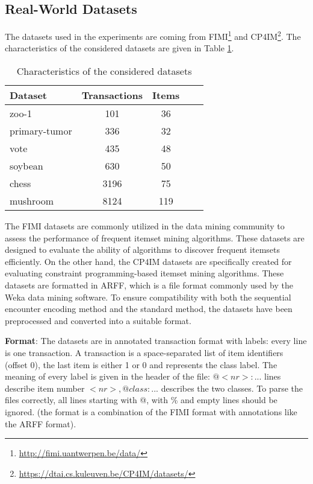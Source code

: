 \subsection{Real-World Datasets}
The datasets used in the experiments are coming from FIMI\footnote{\url{http://fimi.uantwerpen.be/data/}} and CP4IM\footnote{\url{https://dtai.cs.kuleuven.be/CP4IM/datasets/}}.
The characteristics of the considered datasets are given in Table \ref{tab:datasets}.
\begin{table}[H]
    \centering
    \begin{tabular}{|l|c|c|c|c|}
        \hline
        Dataset       & Transactions & Items \\
        \hline
        zoo-1         & 101          & 36    \\
        primary-tumor & 336          & 32    \\
        vote          & 435          & 48    \\
        soybean       & 630          & 50    \\
        chess         & 3196         & 75    \\
        mushroom      & 8124         & 119   \\
        \hline
    \end{tabular}
    \caption{Characteristics of the considered datasets}
    \label{tab:datasets}
\end{table}

The FIMI datasets are commonly utilized in the data mining community to assess the performance of frequent itemset mining algorithms.
These datasets are designed to evaluate the ability of algorithms to discover frequent itemsets efficiently.
On the other hand, the CP4IM datasets are specifically created for evaluating constraint programming-based itemset mining algorithms.
These datasets are formatted in ARFF, which is a file format commonly used by the Weka data mining software.
To ensure compatibility with both the sequential encounter encoding method and the standard method, the datasets have been preprocessed and converted into a suitable format.

\textbf{Format}: The datasets are in annotated transaction format with labels: every line is one transaction.
A transaction is a space-separated list of item identifiers (offset 0), the last item is either 1 or 0 and represents the class label.
The meaning of every label is given in the header of the file: $@<nr>: ...$ lines describe item number $<nr>, @class: ...$ describes the two classes.
To parse the files correctly, all lines starting with @, with \% and empty lines should be ignored. (the format is a combination of the FIMI format with annotations like the ARFF format).

